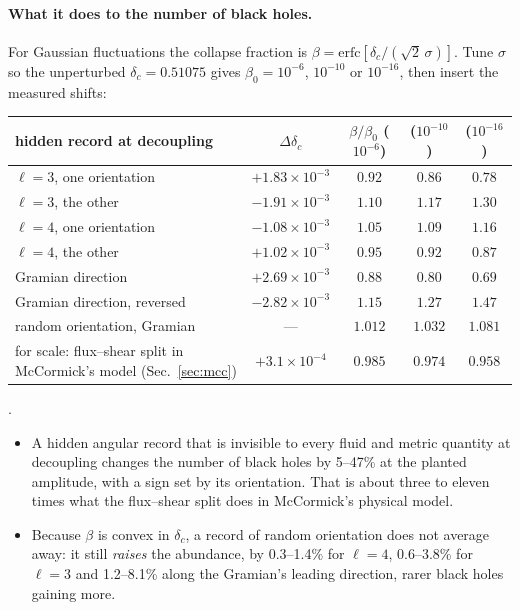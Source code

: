 \paragraph{What it does to the number of black holes.} For Gaussian fluctuations the collapse fraction is $\beta=\mathrm{erfc}[\delta_c/(\sqrt2\,\sigma)]$. Tune $\sigma$ so the unperturbed $\delta_c=0.51075$ gives $\beta_0=10^{-6}$, $10^{-10}$ or $10^{-16}$, then insert the measured shifts:
\begin{center}\small\begin{tabular}{lcccc}\toprule
hidden record at decoupling & $\Delta\delta_c$ & $\beta/\beta_0$ ($10^{-6}$) & ($10^{-10}$) & ($10^{-16}$)\\\midrule
$\ell=3$, one orientation & $+1.83\times10^{-3}$ & $0.92$ & $0.86$ & $0.78$\\
$\ell=3$, the other & $-1.91\times10^{-3}$ & $1.10$ & $1.17$ & $1.30$\\
$\ell=4$, one orientation & $-1.08\times10^{-3}$ & $1.05$ & $1.09$ & $1.16$\\
$\ell=4$, the other & $+1.02\times10^{-3}$ & $0.95$ & $0.92$ & $0.87$\\
Gramian direction & $+2.69\times10^{-3}$ & $0.88$ & $0.80$ & $0.69$\\
Gramian direction, reversed & $-2.82\times10^{-3}$ & $1.15$ & $1.27$ & $1.47$\\
random orientation, Gramian & --- & $1.012$ & $1.032$ & $1.081$\\\midrule
for scale: flux--shear split in McCormick's model (Sec.~\ref{sec:mcc}) & $+3.1\times10^{-4}$ & $0.985$ & $0.974$ & $0.958$\\\bottomrule\end{tabular}\end{center}
.
\begin{itemize}
\item A hidden angular record that is invisible to every fluid and metric quantity at decoupling changes the number of black holes by 5--47\% at the planted amplitude, with a sign set by its orientation. That is about three to eleven times what the flux--shear split does in McCormick's physical model.
\item Because $\beta$ is convex in $\delta_c$, a record of random orientation does not average away: it still \emph{raises} the abundance, by 0.3--1.4\% for $\ell=4$, 0.6--3.8\% for $\ell=3$ and 1.2--8.1\% along the Gramian's leading direction, rarer black holes gaining more.
\end{itemize}
